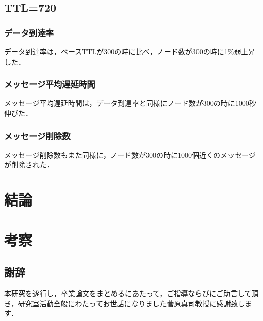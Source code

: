 \documentclass[11pt]{icsthesis}
\begin{document}
\section{TTL=720}
\subsection{データ到達率}
データ到達率は，ベースTTLが300の時に比べ，ノード数が300の時に1\%弱上昇した．
\subsection{メッセージ平均遅延時間}
メッセージ平均遅延時間は，データ到達率と同様にノード数が300の時に1000秒伸びた．
\subsection{メッセージ削除数}
メッセージ削除数もまた同様に，ノード数が300の時に1000個近くのメッセージが削除された．

\chapter{結論}

\chapter{考察}



\clearpage
\fancyhead[L]{}\fancyhead[R]{}
\renewcommand{\headrulewidth}{0truemm}
\section*{謝辞}
本研究を遂行し，卒業論文をまとめるにあたって，ご指導ならびにご助言して頂き，研究室活動全般にわたってお世話になりました菅原真司教授に感謝致します．

\clearpage
\nocite{*}

\fancyhead[L]{\nouppercase{\small\leftmark}}\fancyhead[R]{}
\renewcommand{\headrulewidth}{0.3truemm}

\end{document}
